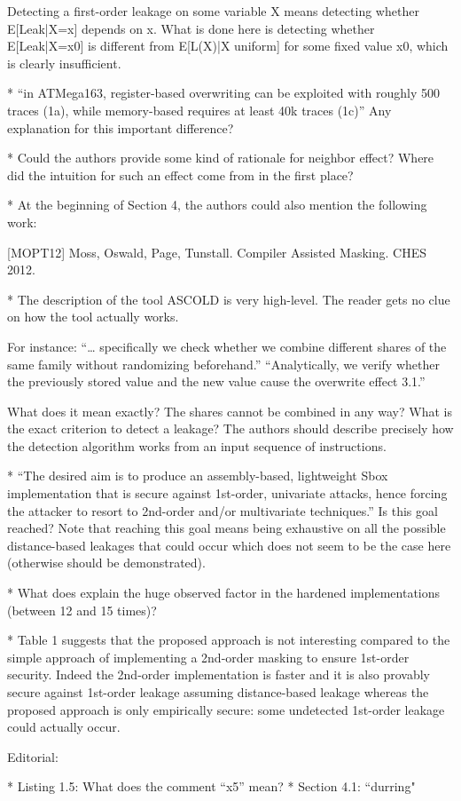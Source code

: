 \documentclass[runningheads, a4paper, 10pt]{llncs}
\begin{document}
{Detecting a first-order leakage on some variable X means detecting whether E[Leak|X=x] depends on x. What is done here is detecting whether E[Leak|X=x0] is different from E[L(X)|X uniform] for some fixed value x0, which is clearly insufficient.

* “in ATMega163, register-based overwriting can be exploited with roughly 500 traces (1a), while memory-based requires at least 40k traces (1c)” Any explanation for this important difference?

* Could the authors provide some kind of rationale for neighbor effect? Where did the intuition for such an effect come from in the first place?

* At the beginning of Section 4, the authors could also mention the following work: 

[MOPT12] Moss, Oswald, Page, Tunstall. Compiler Assisted Masking. CHES 2012.

* The description of the tool ASCOLD is very high-level. The reader gets no clue on how the tool actually works. 

For instance: 
“… specifically we check whether we combine different shares of the same family without randomizing beforehand.”
“Analytically, we verify whether the previously stored value and the new value cause the overwrite effect 3.1.”

What does it mean exactly? The shares cannot be combined in any way? What is the exact criterion to detect a leakage? The authors should describe precisely how the detection algorithm works from an input sequence of instructions.

* “The desired aim is to produce an assembly-based, lightweight Sbox implementation that is secure against 1st-order, univariate attacks, hence forcing the attacker to resort to 2nd-order and/or multivariate techniques.” Is this goal reached? Note that reaching this goal means being exhaustive on all the possible distance-based leakages that could occur which does not seem to be the case here (otherwise should be demonstrated).

* What does explain the huge observed factor in the hardened implementations (between 12 and 15 times)?

* Table 1 suggests that the proposed approach is not interesting compared to the simple approach of implementing a 2nd-order masking to ensure 1st-order security. Indeed the 2nd-order implementation is faster and it is also provably secure against 1st-order leakage assuming distance-based leakage whereas the proposed approach is only empirically secure: some undetected 1st-order leakage could actually occur.


Editorial:

* Listing 1.5: What does the comment “x5” mean?
* Section 4.1: “durring"
}
\end{document}
